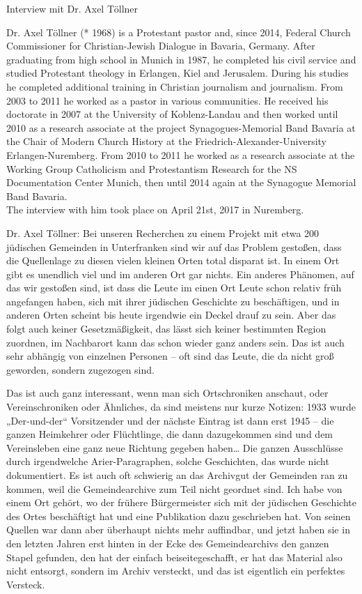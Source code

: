 Interview mit Dr. Axel Töllner 

Dr. Axel Töllner (* 1968) is a Protestant pastor and, since 2014, Federal Church Commissioner for Christian-Jewish Dialogue in Bavaria, Germany. After graduating from high school in Munich in 1987, he completed his civil service and studied Protestant theology in Erlangen, Kiel and Jerusalem. During his studies he completed additional training in Christian journalism and journalism. From 2003 to 2011 he worked as a pastor in various communities. He received his doctorate in 2007 at the University of Koblenz-Landau and then worked until 2010 as a research associate at the project Synagogues-Memorial Band Bavaria at the Chair of Modern Church History at the Friedrich-Alexander-University Erlangen-Nuremberg. From 2010 to 2011 he worked as a research associate at the Working Group Catholicism and Protestantism Research for the NS Documentation Center Munich, then until 2014 again at the Synagogue Memorial Band Bavaria.  \\
The interview with him took place on April 21st, 2017 in Nuremberg.  

 

Dr. Axel Töllner: Bei unseren Recherchen zu einem Projekt mit etwa 200 jüdischen Gemeinden in Unterfranken sind wir auf das Problem gestoßen, dass die Quellenlage zu diesen vielen kleinen Orten total disparat ist. In einem Ort gibt es unendlich viel und im anderen Ort gar nichts. Ein anderes Phänomen, auf das wir gestoßen sind, ist dass die Leute im einen Ort Leute schon relativ früh angefangen haben, sich mit ihrer jüdischen Geschichte zu beschäftigen, und in anderen Orten scheint bis heute irgendwie ein Deckel drauf zu sein. Aber das folgt auch keiner Gesetzmäßigkeit, das lässt sich keiner bestimmten Region zuordnen, im Nachbarort kann das schon wieder ganz anders sein. Das ist auch sehr abhängig von einzelnen Personen – oft sind das Leute, die da nicht groß geworden, sondern zugezogen sind. 

Das ist auch ganz interessant, wenn man sich Ortschroniken anschaut, oder Vereinschroniken oder Ähnliches, da sind meistens nur kurze Notizen: 1933 wurde „Der-und-der“ Vorsitzender und der nächste Eintrag ist dann erst 1945 – die ganzen Heimkehrer oder Flüchtlinge, die dann dazugekommen sind und dem Vereinsleben eine ganz neue Richtung gegeben haben… Die ganzen Ausschlüsse durch irgendwelche Arier-Paragraphen, solche Geschichten, das wurde nicht dokumentiert. 
Es ist auch oft schwierig an das Archivgut der Gemeinden ran zu kommen, weil die Gemeindearchive zum Teil nicht geordnet sind. Ich habe von einem Ort gehört, wo der frühere Bürgermeister sich mit der jüdischen Geschichte des Ortes beschäftigt hat und eine Publikation dazu geschrieben hat. Von seinen Quellen war dann aber überhaupt nichts mehr auffindbar, und jetzt haben sie in den letzten Jahren erst hinten in der Ecke des Gemeindearchivs den ganzen Stapel gefunden, den hat der einfach beiseitegeschafft, er hat das Material also nicht entsorgt, sondern im Archiv versteckt, und das ist eigentlich ein perfektes Versteck. 

